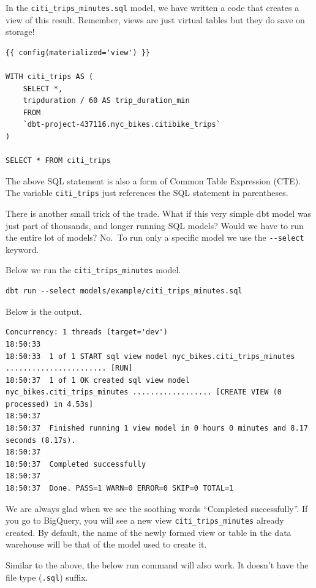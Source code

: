 \documentclass[
]{book}
\begin{document}
In the \texttt{citi\_trips\_minutes.sql} model, we have written a code that creates a view of this result. Remember, views are just virtual tables but they do save on storage!

\begin{verbatim}
{{ config(materialized='view') }}

WITH citi_trips AS (
    SELECT *, 
    tripduration / 60 AS trip_duration_min
    FROM 
    `dbt-project-437116.nyc_bikes.citibike_trips` 
)

SELECT * FROM citi_trips
\end{verbatim}

The above SQL statement is also a form of Common Table Expression (CTE). The variable \texttt{citi\_trips} just references the SQL statement in parentheses.

There is another small trick of the trade. What if this very simple dbt model was just part of thousands, and longer running SQL models? Would we have to run the entire lot of models? No.~To run only a specific model we use the \texttt{-\/-select} keyword.

Below we run the \texttt{citi\_trips\_minutes} model.

\begin{verbatim}
dbt run --select models/example/citi_trips_minutes.sql
\end{verbatim}

Below is the output.

\begin{verbatim}
Concurrency: 1 threads (target='dev')
18:50:33  
18:50:33  1 of 1 START sql view model nyc_bikes.citi_trips_minutes ....................... [RUN]
18:50:37  1 of 1 OK created sql view model nyc_bikes.citi_trips_minutes .................. [CREATE VIEW (0 processed) in 4.53s]
18:50:37  
18:50:37  Finished running 1 view model in 0 hours 0 minutes and 8.17 seconds (8.17s).
18:50:37  
18:50:37  Completed successfully
18:50:37  
18:50:37  Done. PASS=1 WARN=0 ERROR=0 SKIP=0 TOTAL=1
\end{verbatim}

We are always glad when we see the soothing words ``Completed successfully''. If you go to BigQuery, you will see a new view \texttt{citi\_trips\_minutes} already created. By default, the name of the newly formed view or table in the data warehouse will be that of the model used to create it.

Similar to the above, the below run command will also work. It doesn't have the file type (\texttt{.sql}) suffix.
\end{document}
